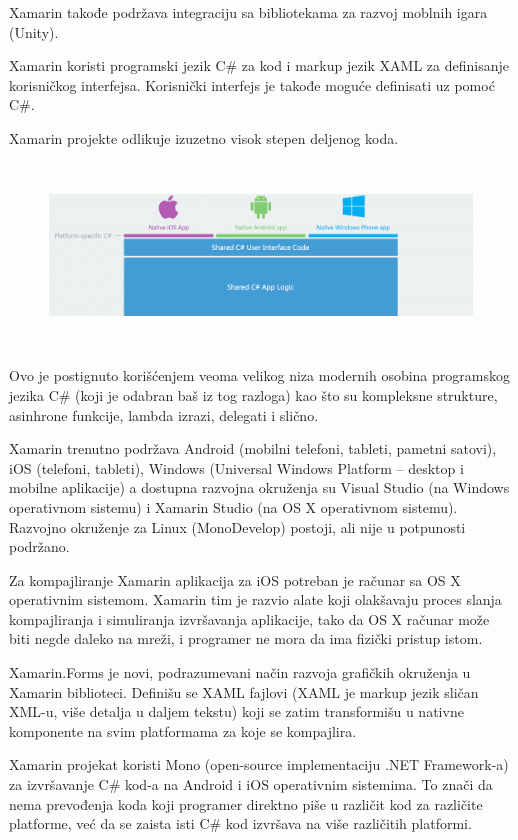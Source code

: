 \documentclass[a4paper]{article}
\begin{document}
Xamarin takođe podržava integraciju sa bibliotekama za razvoj moblnih
igara (Unity). 

Xamarin koristi programski jezik C\# za kod i markup jezik XAML za
definisanje korisničkog interfejsa. Korisnički interfejs je takođe
moguće definisati uz pomoć C\#. 

Xamarin projekte odlikuje izuzetno visok stepen deljenog koda.



\begin{figure}
\centering
\includegraphics[width=170mm,height=49mm]{msc-img10.png}
\end{figure}
Ovo je postignuto korišćenjem veoma velikog niza modernih osobina
programskog jezika C\# (koji je odabran baš iz tog razloga) kao što su
kompleksne strukture, asinhrone funkcije, lambda izrazi, delegati i
slično.

Xamarin trenutno podržava Android (mobilni telefoni, tableti, pametni
satovi), iOS (telefoni, tableti), Windows (Universal Windows Platform –
desktop i mobilne aplikacije) a dostupna razvojna okruženja su Visual
Studio (na Windows operativnom sistemu) i Xamarin Studio (na OS X
operativnom sistemu). Razvojno okruženje za Linux (MonoDevelop)
postoji, ali nije u potpunosti podržano. 

Za kompajliranje Xamarin aplikacija za iOS potreban je računar sa OS X
operativnim sistemom. Xamarin tim je razvio alate koji olakšavaju
proces slanja kompajliranja i simuliranja izvršavanja aplikacije, tako
da OS X računar može biti negde daleko na mreži, i programer ne mora da
ima fizički pristup istom.

Xamarin.Forms je novi, podrazumevani način razvoja grafičkih okruženja u
Xamarin biblioteci. Definišu se XAML fajlovi (XAML je markup jezik
sličan XML-u, više detalja u daljem tekstu) koji se zatim transformišu
u nativne komponente na svim platformama za koje se kompajlira.

Xamarin projekat koristi Mono (open-source implementaciju .NET
Framework-a) za izvršavanje C\# kod-a na Android i iOS operativnim
sistemima. To znači da nema prevođenja koda koji programer direktno
piše u različit kod za različite platforme, već da se zaista isti C\#
kod izvršava na više različitih platformi.
\end{document}
